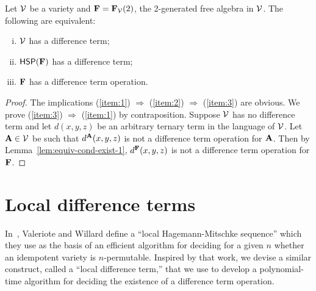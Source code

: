 \begin{thm}
  \label{thm:F}
Let $\mathcal{V}$ be a variety and $\mathbf{F} = \mathbf{F}_{\mathcal{V}}(2)$, the 2-generated
free algebra in $\mathcal{V}$. The following are equivalent:
\begin{enumerate}[(i)]
\item \label{item:1}
  $\mathcal{V}$ has a difference term;
\item \label{item:2}
  $\mathsf{H} \mathsf{S} \mathsf{P} (\mathbf{F})$ has a difference term;
\item \label{item:3}
  $\mathbf{F}$ has a difference term operation.
\end{enumerate}
\end{thm}
\begin{proof}
  The implications
  (\ref{item:1}) $\Rightarrow$  (\ref{item:2}) $\Rightarrow$  (\ref{item:3}) are
  obvious. We prove
  (\ref{item:3}) $\Rightarrow$  (\ref{item:1}) by contraposition.
  Suppose $\mathcal{V}$ has no difference term and let
  $d(x,y,z)$ be an arbitrary ternary term in the language of $\mathcal{V}$.
  Let $\mathbf{A}\in \mathcal{V}$ be such that $d^{\mathbf{A}}(x,y,z)$ is not a difference term
  operation for $\mathbf{A}$. Then by Lemma~\ref{lem:equiv-cond-exist-1}, $d^{\mathbf{F}}(x,y,z)$ 
  is not a difference term operation for $\mathbf{F}$.
\end{proof}




\section{Local difference terms}
\label{sec:local-diff-terms}
In~\cite{MR3239624},
Valeriote and Willard define %
a ``local Hagemann-Mitschke sequence'' which they use as the basis of
an efficient algorithm for deciding for a given $n$ whether an idempotent
variety is $n$-permutable. 
Inspired by that work, we devise a similar construct, called
a ``local difference term,'' that we use to develop a polynomial-time
algorithm for deciding the existence of a difference term operation.



